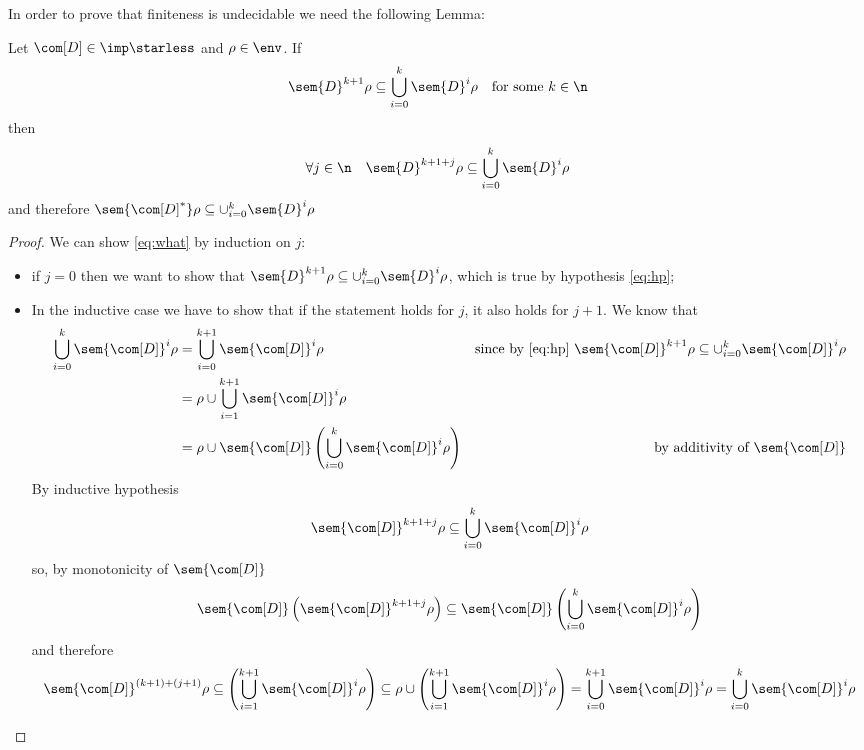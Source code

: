 In order to prove that finiteness is undecidable we need the following
Lemma:

\begin{lemma}\label{le:contain}
  Let \(\com[D] \in \imp\starless\) and \(\rho \in \env\). If
  \begin{equation}\label{eq:hp}
    \sem{D}^{k+1}\rho \subseteq \bigcup_{i=0}^k\sem{D}^i\rho \quad \text{for some } k \in \n
  \end{equation}
  then
  \begin{equation}\label{eq:what}
    \forall j \in \n \quad \sem{D}^{k+1+j}\rho \subseteq \bigcup_{i=0}^k\sem{D}^i\rho
  \end{equation}
  and therefore
  \(\sem{\com[D]^*}\rho \subseteq \cup_{i=0}^k\sem{D}^i\rho\)
\end{lemma}
\begin{proof}
  We can show \eqref{eq:what} by induction on \(j\):
  \begin{itemize}
  \item if \(j=0\) then we want to show that
    \(\sem{D}^{k+1}\rho \subseteq \cup_{i=0}^k\sem{D}^i\rho\), which is
    true by hypothesis \eqref{eq:hp};
    
  \item In the inductive case we have to show that if the
    statement holds for \(j\), it also holds for \(j+1\). We know
    that
    \begin{align*}
      \bigcup_{i=0}^k\sem{\com[D]}^i\rho & = \bigcup_{i=0}^{k+1}\sem{\com[D]}^i\rho & \text{since by \eqref{eq:hp} } \sem{\com[D]}^{k+1}\rho \subseteq \cup_{i=0}^k\sem{\com[D]}^i\rho \\
                                         & = \rho \cup \bigcup _{i=1}^{k+1}\sem{\com[D]}^i \rho \\
                                         & = \rho \cup \sem{\com[D]}\left( \bigcup _{i=0}^k\sem{\com[D]}^i \rho\right) & \text{by additivity of } \sem{\com[D]}
    \end{align*}
    By inductive hypothesis
    \begin{equation*}
      \sem{\com[D]}^{k+1+j}\rho \subseteq \bigcup_{i=0}^k\sem{\com[D]}^i\rho
    \end{equation*}
    so, by monotonicity of \(\sem{\com[D]}\)
    \begin{equation*}
      \sem{\com[D]}\left( \sem{\com[D]}^{k+1+j}\rho\right) \subseteq \sem{\com[D]}\left(\bigcup_{i=0}^k\sem{\com[D]}^i\rho \right)
    \end{equation*}
    and therefore
    \begin{equation*}
      \sem{\com[D]}^{(k+1)+(j+1)}\rho \subseteq \left(\bigcup_{i=1}^{k+1}\sem{\com[D]}^i\rho \right) \subseteq \rho \cup \left(\bigcup_{i=1}^{k+1}\sem{\com[D]}^i\rho \right) = \bigcup_{i=0}^{k+1}\sem{\com[D]}^i\rho = \bigcup_{i=0}^{k}\sem{\com[D]}^i\rho
    \end{equation*}
  \end{itemize}
\end{proof}

